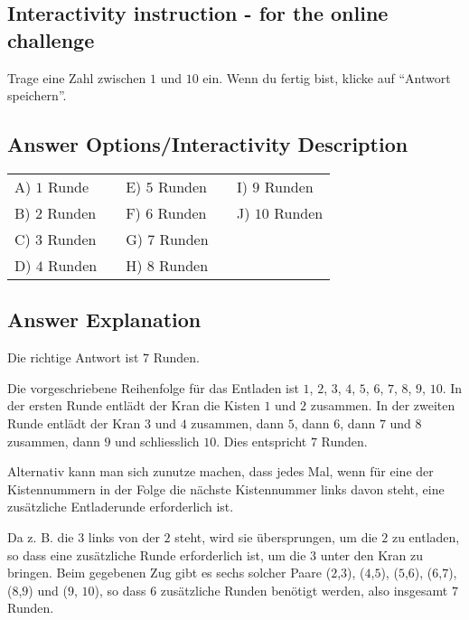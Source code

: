 \documentclass[a4paper,11pt]{report}
\newcommand{\taskGraphicsFolder}{..}
\begin{document}
\subsection*{Interactivity instruction - for the online challenge}

Trage eine Zahl zwischen $1$ und $10$ ein. Wenn du fertig bist, klicke auf \enquote{Antwort speichern}.

\begingroup
\renewcommand{\arraystretch}{1.5}
\subsection*{Answer Options/Interactivity Description}

\begin{tabular}{ @{} l l l @{} }
  A) $1$ Runde & E) $5$ Runden & I) $9$ Runden \\ 
  B) $2$ Runden & F) $6$ Runden & J) $10$ Runden \\ 
  C) $3$ Runden & G) $7$ Runden &  \\ 
  D) $4$ Runden ${~~~}$ & H) $8$ Runden ${~~~}$ & 
\end{tabular}

\endgroup

\subsection*{Answer Explanation}

Die richtige Antwort ist $7$ Runden.

Die vorgeschriebene Reihenfolge für das Entladen ist $1$, $2$, $3$, $4$, $5$, $6$, $7$, $8$, $9$, $10$. In der ersten Runde entlädt der Kran die Kisten $1$ und $2$ zusammen. In der zweiten Runde entlädt der Kran $3$ und $4$ zusammen, dann $5$, dann $6$, dann $7$ und $8$ zusammen, dann $9$ und schliesslich $10$. Dies entspricht $7$ Runden.

Alternativ kann man sich zunutze machen, dass jedes Mal, wenn für eine der Kistennummern in der Folge die nächste Kistennummer links davon steht, eine zusätzliche Entladerunde erforderlich ist.

{\centering%
\par}

Da z. B. die $3$ links von der $2$ steht, wird sie übersprungen, um die $2$ zu entladen, so dass eine zusätzliche Runde erforderlich ist, um die $3$ unter den Kran zu bringen. Beim gegebenen Zug gibt es sechs solcher Paare ($2$,$3$), ($4$,$5$), ($5$,$6$), ($6$,$7$), ($8$,$9$) und ($9$, $10$), so dass $6$ zusätzliche Runden benötigt werden, also insgesamt $7$ Runden.
\end{document}
